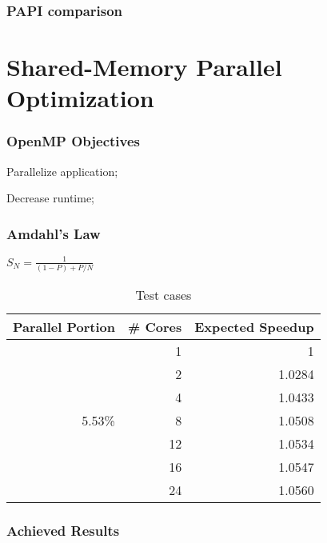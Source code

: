 \documentclass{beamer}
\begin{document}
\begin{frame}
	\frametitle{PAPI comparison}
	\begin{figure}[!htp]
	\label{fig:original_papi}
	\end{figure}
	\begin{figure}[!htp]
	\label{fig:optm_papi}
	\end{figure}
\end{frame}


\section{Shared-Memory Parallel Optimization}
\begin{frame}
	\frametitle{OpenMP Objectives}
	\begin{description}
		\item Parallelize application;
		\item Decrease runtime;
	\end{description}
\end{frame}	


\begin{frame}
	\frametitle{Amdahl's Law}
		
		$S_{N}=\frac{1}{(1-P) + P/N}$

		\begin{center}
			\begin{table}[!htp]
			\begin{tabular}{|r|r|r|}
			\hline
			\textbf{Parallel Portion} & \textbf{\# Cores} & \textbf{Expected Speedup}\\
			\hline
			 & 1 & 1 \\
			 & 2 & 1.0284 \\
			 & 4 & 1.0433 \\
			 5.53\% & 8 & 1.0508 \\
			 & 12 & 1.0534 \\
			 & 16 & 1.0547 \\
			 & 24 & 1.0560 \\
			\hline
			\end{tabular}
			\caption{Test cases}
			\label{tab:testcases}
			\end{table}
		\end{center}	
\end{frame}

\begin{frame}
	\frametitle{Achieved Results}

\end{frame}
\end{document}
